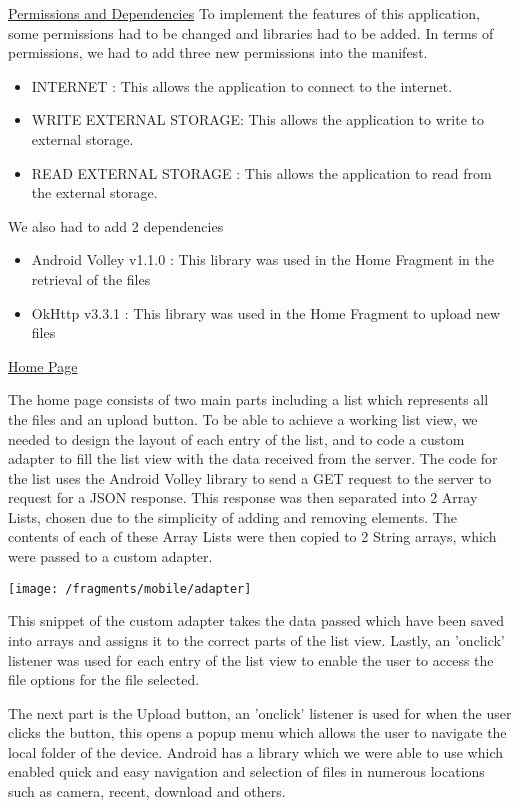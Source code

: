 \documentclass{article}
\begin{document}
\underline{Permissions and Dependencies}
To implement the features of this application, some permissions had to be changed and libraries had to be added. In terms of permissions, we had to add three new permissions into the manifest. 

\begin{itemize}
\item INTERNET : This allows the application to connect to the internet.
\item WRITE EXTERNAL STORAGE: This allows the application to write to external storage.
\item READ EXTERNAL STORAGE : This allows the application to read from the external storage.
\end{itemize}

We also had to add 2 dependencies 

\begin{itemize}
\item Android Volley v1.1.0 : This library was used in the Home Fragment in the retrieval of the files
\item OkHttp v3.3.1 : This library was used in the Home Fragment to upload new files
\end{itemize}


\underline{Home Page}

The home page consists of two main parts including a list which represents all the files and an upload button. To be able to achieve a working list view, we needed to design the layout of each entry of the list, and to code a custom adapter to fill the list view with the data received from the server. The code for the list uses the Android Volley library to send a GET request to the server to request for a JSON response. This response was then separated into 2 Array Lists, chosen due to the simplicity of adding and removing elements. The contents of each of these Array Lists were then copied to 2 String arrays, which were passed to a custom adapter. 

\texttt{[image: /fragments/mobile/adapter]}

This snippet of the custom adapter takes the data passed which have been saved into arrays and assigns it to the correct parts of the list view. Lastly, an 'onclick' listener was used for each entry of the list view to enable the user to access the file options for the file selected. 

The next part is the Upload button, an 'onclick' listener is used for when the user clicks the button, this opens a popup menu which allows the user to navigate the local folder of the device. Android has a library which we were able to use which enabled quick and easy navigation and selection of files in numerous locations such as camera, recent, download and others. 
\end{document}
